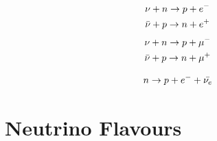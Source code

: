 \begin{equation}
    \begin{split}
    \nu + n \rightarrow p + e^- \\
    \Bar{\nu} + p \rightarrow n + e^+
    \label{test_e_decay}
    \end{split}
\end{equation}
\begin{equation}
    \begin{split}
    \nu + n \rightarrow p + \mu^-  \\
    \Bar{\nu} + p \rightarrow n + \mu^+
    \label{test_mu_decay}
    \end{split}
\end{equation}

\begin{equation}
    n \rightarrow p + e^- + \Bar{\nu_e} 
    \label{modern_beta_decay}
\end{equation}

\section{Neutrino Flavours}
